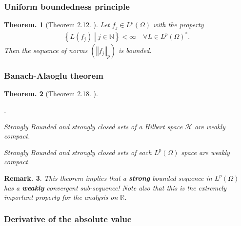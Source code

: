 \documentclass[openany, a4paper, oneside]{jsbook}
\newcounter{enum2}
\renewenvironment{enumerate}{%
\begin{list}%
{%
\arabic{enum2}.\ \,%
}%
{%
\usecounter{enum2}
\setlength{\itemindent}{0pt}%
\setlength{\leftmargin}{15pt}%
\setlength{\rightmargin}{0pt}%
\setlength{\labelsep}{0pt}%
\setlength{\labelwidth}{6pt}%
\setlength{\itemsep}{0pt}%
\setlength{\parsep}{0pt}%
\setlength{\listparindent}{0pt}%
}
}{%
\end{list}%
}
\theoremstyle{break}
\newtheorem{thm}{Theorem.}[section]
\theoremstyle{breakdefn}
\newtheorem{rem}[thm]{Remark.}
\newcommand{\norm}[1]{\left\Vert#1\right\Vert}
\newcommand{\rbk}[1]{\left (#1\right)}
\newcommand{\relmiddle}[1]{\mathrel{}\middle#1\mathrel{}}
\newcommand{\set}[2]{\left\{#1 \relmiddle| #2\right\}}
\newcommand{\bbN}{\mathbb{N}}
\newcommand{\bbR}{\mathbb{R}}
\newcommand{\calH}{\mathcal{H}}
\newcommand{\upbf}[1]{\textup{\textbf{#1}}}
\begin{document}
\subsubsection{Uniform boundedness principle}


\begin{thm}[Theorem 2.12. \cite{LiebLoss1}]\label{Lieb-Loss_Analysis_chap11_2}
 Let $f_j \in L^p (\Omega)$ with the property
 \begin{align}
  \set{L (f_j)}{j \in \bbN} < \infty \quad \forall L \in L^p \rbk{\Omega}^*.
 \end{align}
 Then the sequence of norms $(\norm{f_j}_p)$ is bounded.
\end{thm}
\subsubsection{Banach-Alaoglu theorem}


\begin{thm}[Theorem 2.18. \cite{LiebLoss1}]\label{Lieb-Loss_Analysis_chap11_8}
\begin{enumerate}
\item Strongly Bounded and strongly closed sets of a Hilbert space $\calH$ are weakly compact.
\item Strongly Bounded and strongly closed sets of each $L^p \rbk{\Omega}$ space are weakly compact.
\end{enumerate}
\end{thm}
\begin{rem}
 This theorem implies that a \upbf{strong} bounded sequence in $L^p (\Omega)$ has a \upbf{weakly} convergent sub-sequence!
 Note also that this is the extremely important property for the analysis on $\bbR$.
\end{rem}
\subsubsection{Derivative of the absolute value}
\end{document}
